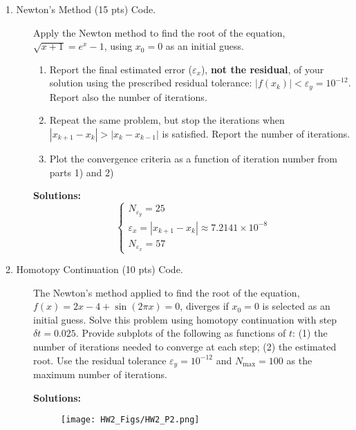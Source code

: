 \documentclass[12pt]{article}
\begin{document}
	\begin{description}
		\item[1. Newton's Method (15 pts) Code.] Apply the Newton method to find the root of the equation, $\sqrt{x+1} = e^{x} - 1$, using $x_0 = 0$ as an initial guess.
		\begin{enumerate}
			\item Report the final estimated error ($ \varepsilon_x$), {\bf not the residual}, of your solution using the prescribed residual tolerance: $| f(x_k) | < \varepsilon_y = 10^{-12}$. Report also the number of iterations. 
			\item Repeat the same problem, but stop the iterations when $| x_{k+1} - x_k | > | x_k - x_{k-1} |$ is satisfied. Report the number of iterations.
			\item Plot the convergence criteria as a function of iteration number from parts 1) and 2)
		\end{enumerate}
		
		\ifsolution
		\color{red}
		\textbf{Solutions:} \\
		\begin{equation*}
		\begin{cases}
		N_{\varepsilon_{y}} = 25 \\
		\varepsilon_{x} = \left|x_{k+1}-x_{k}\right| \approx 7.2141 \times 10^{-8} \\
		N_{\varepsilon_{x}} = 57
		\end{cases}
		\end{equation*}
		\color{black}
		\fi
		
		\item[2. Homotopy Continuation (10 pts) Code.] The Newton's method applied to find the root of the equation, $f (x) = 2x - 4 + \sin(2\pi x) = 0$, diverges if $x_0 = 0$ is selected as an initial guess. Solve this problem using homotopy continuation with step $\delta t = 0.025$. Provide subplots of the following as functions of $t$: (1) the number of iterations needed to converge at each step; (2) the estimated root. Use the residual tolerance $\varepsilon_y = 10^{-12}$ and $N_{\max} = 100$ as the maximum number of iterations.
		
		\ifsolution
		\color{red}
		\textbf{Solutions:}
		\begin{figure}[ht]
			\centering\texttt{[image: HW2\_Figs/HW2\_P2.png]}
		\end{figure}
		\color{black}
		\fi
		

\end{description}
\end{document}
